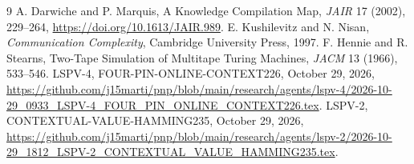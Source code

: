 \documentclass[11pt]{article}
\begin{document}
\begin{thebibliography}{9}
 A. Darwiche and P. Marquis, A Knowledge Compilation Map, \emph{JAIR} 17 (2002), 229--264, \url{https://doi.org/10.1613/JAIR.989}.
 E. Kushilevitz and N. Nisan, \emph{Communication Complexity}, Cambridge University Press, 1997.
 F. Hennie and R. Stearns, Two-Tape Simulation of Multitape Turing Machines, \emph{JACM} 13 (1966), 533--546.
 LSPV-4, FOUR-PIN-ONLINE-CONTEXT226, October 29, 2026, \url{https://github.com/j15marti/pnp/blob/main/research/agents/lspv-4/2026-10-29_0933_LSPV-4_FOUR_PIN_ONLINE_CONTEXT226.tex}.
 LSPV-2, CONTEXTUAL-VALUE-HAMMING235, October 29, 2026, \url{https://github.com/j15marti/pnp/blob/main/research/agents/lspv-2/2026-10-29_1812_LSPV-2_CONTEXTUAL_VALUE_HAMMING235.tex}.
\end{thebibliography}
\end{document}
